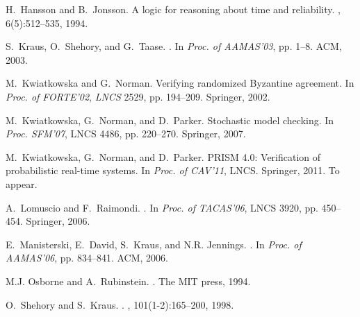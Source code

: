 \documentclass{llncs}
\begin{document}
{\begin{thebibliography}{10}
H.~Hansson and B.~Jonsson.
\newblock A logic for reasoning about time and reliability.
, 6(5):512--535, 1994.

S.~Kraus, O.~Shehory, and G.~Taase.
.
\newblock In {\em Proc. of AAMAS'03}, pp. 1--8. ACM, 2003.

M.~Kwiatkowska and G.~Norman.
\newblock Verifying randomized {Byzantine} agreement.
\newblock In {\em Proc. of FORTE'02}, {\em LNCS} 2529, pp. 194--209. Springer, 2002.

M.~Kwiatkowska, G.~Norman, and D.~Parker.
\newblock Stochastic model checking.
\newblock In {\em Proc. SFM'07}, LNCS 4486, pp. 220--270. Springer, 2007.

M.~Kwiatkowska, G.~Norman, and D.~Parker.
\newblock PRISM 4.0: Verification of probabilistic real-time systems.
\newblock In {\em Proc. of CAV'11}, LNCS. Springer, 2011.
\newblock To appear.

A.~Lomuscio and F.~Raimondi.
.
\newblock In {\em Proc. of TACAS'06}, LNCS 3920, pp. 450--454. Springer, 2006.

E.~Manisterski, E.~David, S.~Kraus, and N.R. Jennings.
.
\newblock In {\em Proc. of AAMAS'06}, pp. 834--841. ACM, 2006.

M.J. Osborne and A.~Rubinstein.
.
\newblock The MIT press, 1994.

O.~Shehory and S.~Kraus.
.
, 101(1-2):165--200, 1998.

\end{thebibliography}


}
%
%
%
\end{document}
